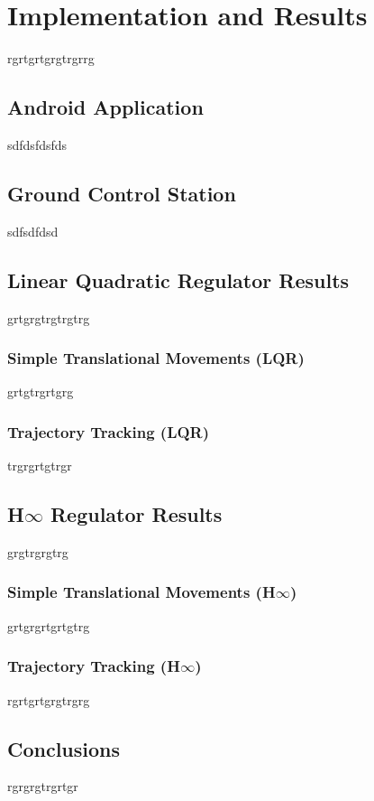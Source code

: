 \chapter{Implementation and Results} \label{ch:implementation}
rgrtgrtgrgtrgrrg
\section{Android Application}
sdfdsfdsfds
\section{Ground Control Station}
sdfsdfdsd
\section{Linear Quadratic Regulator Results}
grtgrgtrgtrgtrg

\subsection{Simple Translational Movements (LQR)}
grtgtrgrtgrg
\subsection{Trajectory Tracking (LQR)}
trgrgrtgtrgr

\section{H$\infty$ Regulator Results}
grgtrgrgtrg

\subsection{Simple Translational Movements (H$\infty$)}
grtgrgrtgrtgtrg

\subsection{Trajectory Tracking (H$\infty$)}
rgrtgrtgrgtrgrg
\section{Conclusions}
rgrgrgtrgrtgr